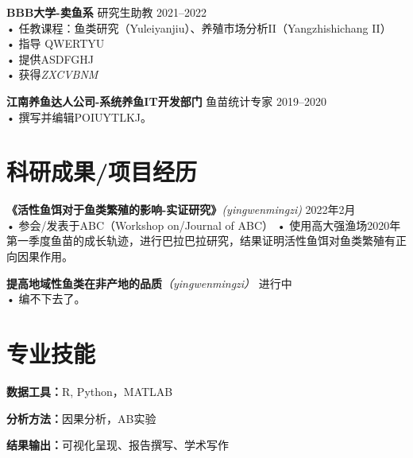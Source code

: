 \documentclass[10pt, letterpaper]{article}
\begin{document}
\noindent\textbf{BBB大学-卖鱼系} \hfill \quad\quad\quad\quad\quad\quad\quad 研究生助教 \hfill 2021--2022 \\
\quad • 任教课程：鱼类研究（Yuleiyanjiu）、养殖市场分析II（Yangzhishichang II）\\
\quad • 指导 QWERTYU\\
\quad • 提供ASDFGHJ\\
\quad • 获得\textit{ZXCVBNM}

\noindent\textbf{江南养鱼达人公司-系统养鱼IT开发部门} \hfill 鱼苗统计专家 \hfill 2019--2020 \\
\quad • 撰写并编辑POIUYTLKJ。

\vspace{-0.2cm}
\section{科研成果/项目经历}
\noindent\textbf{《活性鱼饵对于鱼类繁殖的影响-实证研究》}\textit{(yingwenmingzi)} \hfill 2022年2月 \\
\quad • 参会/发表于ABC（Workshop on/Journal of ABC）
\quad • 使用高大强渔场2020年第一季度鱼苗的成长轨迹，进行巴拉巴拉研究，结果证明活性鱼饵对鱼类繁殖有正向因果作用。

\noindent\textbf{提高地域性鱼类在非产地的品质}\textit{（yingwenmingzi）} \hfill 进行中 \\
\quad • 编不下去了。

\vspace{-0.2cm}

\section{专业技能}
\noindent\textbf{数据工具：}R, Python，MATLAB

\noindent\textbf{分析方法：}因果分析，AB实验

\noindent\textbf{结果输出：}可视化呈现、报告撰写、学术写作
\end{document}
